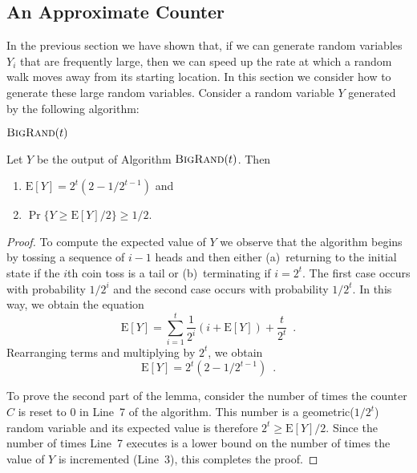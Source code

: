 \documentclass[lotsofwhite]{patmorin}
\newcommand{\bigrand}{\textsc{BigRand}}
\newcommand{\E}{\mathrm{E}}
\begin{document}
\subsection{An Approximate Counter}

In the previous section we have shown that, if we can generate random
variables $Y_i$ that are frequently large, then we can speed up the
rate at which a random walk moves away from its starting location.  In
this section we consider how to generate these large random variables.
Consider a random variable $Y$ generated by the following algorithm:

\noindent
\begin{minipage}{\textwidth}
$\bigrand(t)$
\begin{algorithmic}[1]
  \ELSE
  \ENDIF
\ENDWHILE
{}
\end{algorithmic}
\end{minipage}

\begin{lem}
Let $Y$ be the output of Algorithm $\bigrand(t)$.  Then 
\begin{enumerate}
\item $\E[Y]=2^t(2-1/2^{t-1})$ and
\item $\Pr\{Y \ge \E[Y] / 2\} \ge 1/2$.
\end{enumerate}
\end{lem}

\begin{proof}
To compute the expected value of $Y$ we observe that the algorithm
begins by tossing a sequence of $i-1$ heads and then either
(a)~returning to the initial state if the $i$th coin toss is a tail
or (b)~terminating if $i=2^t$.  The first case occurs with probability
$1/2^i$ and the second case occurs with probability $1/2^t$.
In this way, we obtain the equation
\[
   \E[Y] = \sum_{i=1}^{t} \frac{1}{2^i}\left(i + \E[Y]\right) +
\frac{t}{2^t} \enspace .
\]
Rearranging terms and multiplying by $2^{t}$, we obtain
\[
   \E[Y] = 2^t(2-1/2^{t-1}) \enspace .  
\]

To prove the second part of the lemma, consider the number of times
the counter $C$ is reset to $0$ in Line~7 of the algorithm.  This
number is a geometric($1/2^t$) random variable and its expected value
is therefore $2^t \ge \E[Y]/2$.  Since the number of times Line~7
executes is a lower bound on the number of times the value of $Y$ is
incremented (Line~3), this completes the proof.
\end{proof}
\end{document}
